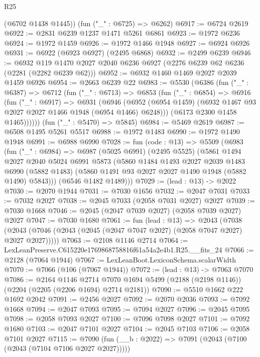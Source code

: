 \begin{lexlean}{R25}
\begin{coremodule}
      (@6702 @1438 @1445))
    (fun ("_" : @6725) => @6262)
@6917 := @6724 @2619
@6922 := @2831 @6239 @1237 @1471 @5261 @6861
@6923 := @1972 @6236
@6924 := @1972 @1459
@6926 := @1972 @1466 @1948
@6927 := @6924 @6926
@6931 := @6922 (@6923 @6927) (@2495 @6868)
@6932 := @2499 @6239
@6946 := @6932 @119 @1470 @2027 @2040 @6236 @6927 (@2276 @6239 @62 @6236 (@2281 (@2282 @6239 @62)))
@6952 := @6932 @1460 @1469 @2027 @2039 @1459 @6926
@6954 := @2663 @6239 @22
@6983 := @5530
    (@6386
      (fun ("_" : @6387) =>
      @6712
        (fun ("_" : @6713) =>
        @6853
          (fun ("_" : @6854) =>
          @6916
            (fun ("_" : @6917) =>
            @6931
              (@6946
                (@6952 (@6954 @1459) (@6932 @1467 @93 @2027 @2027 @1466 @1948 (@6954 @1466) @6248)))
              (@6173 @2300 @1458 @1465))))))
    (fun ("_" : @5470) => @5845)
@6984 := @5469 @2619
@6987 := @6508 @1495 @5261 @5517
@6988 := @1972 @1483
@6990 := @1972 @1490 @1948
@6991 := @6988 @6990
@7028 := fun (code : @13) =>
  @5509
    (@6983
      (fun ("_" : @6984) =>
      @6987
        (@5025 @6991)
        (@2495 @5525)
        (@5861
          @1494
          @2027
          @2040
          @5024
          @6991
          @5873
          (@5860
            @1484
            @1493
            @2027
            @2039
            @1483
            @6990
            (@5882 @1483)
            (@5860 @1491 @93 @2027 @2027 @1490 @1948 (@5882 @1490) @5843)))
        (@6546 @1482 @1489)))
@7029 := (lead : @13) -> @2022
@7030 := @2070 @1944
@7031 := @7030 @1656
@7032 := @2047 @7031
@7033 := @7032 @2027
@7038 := @2045 @7033 (@2058 @7031 @2027) @2027
@7039 := @7030 @1668
@7046 := @2045 (@2047 @7039 @2027) (@2058 @7039 @2027) @2027
@7047 := @7030 @1680
@7061 := fun (lead : @13) =>
  @2043 (@7038 (@2043 (@7046 (@2043 (@2045 (@2047 @7047 @2027) (@2058 @7047 @2027) @2027 @2027)))))
@7063 := @2108 @1146 @2714
@7064 := LexLeanPreserve.C615220e1769868758816f61a54a2e4b1.R25.__fits_24
@7066 := @2128 (@7064 @1944)
@7067 := LexLeanBoot.LexiconSchema.scalarWidth
@7070 := @7066 (@106 (@7067 @1944))
@7072 := (lead : @13) -> @7063 @7070
@7086 := @2164
    @1146
    @2714
    @7070
    @1694
    @5499
    (@2188 (@2198 @1146))
    (@2204 (@2205 (@2206 @1694) @2714 @2181))
@7090 := @5510 @1662 @222 @1692 @2042
@7091 := @2456 @2027
@7092 := @2070 @2036
@7093 := @7092 @1668
@7094 := @2047 @7093
@7095 := @7094 @2027
@7096 := @2045 @7095
@7098 := @2058 @7093 @2027
@7100 := @7096 @7098 @2027
@7101 := @7092 @1680
@7103 := @2047 @7101 @2027
@7104 := @2045 @7103
@7106 := @2058 @7101 @2027
@7115 := @7090 (fun (__b : @2022) => @7091 (@2043 (@7100 (@2043 (@7104 @7106 @2027 @2027)))))

\end{coremodule}
\end{lexlean}
